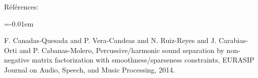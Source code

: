 \documentclass[a0paper,portrait]{baposter}
\begin{document}
\begin{poster}
{\vspace{-0.5em} 

Références:
\footnotesize 											%
\renewcommand{\section}[2]{\vskip 0.05em}		%
\begin{thebibliography}{1}							%
\itemsep=-0.01em										%
\setlength{\baselineskip}{0.4em}					%


 F. Canadas-Quesada and P. Vera-Candeas and N. Ruiz-Reyes and J. Carabias-Orti and P. Cabanas-Molero, Percussive/harmonic sound separation by non-negative matrix factorization with smoothness/sparseness constraints, EURASIP Journal on Audio, Speech, and Music Processing, 2014.
\end{thebibliography}

}

\end{poster}
\end{document}
